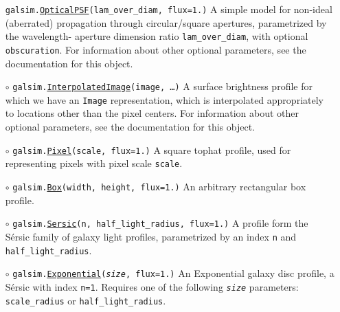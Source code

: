 \documentclass[preprint,10pt]{../../devel/modules/aastex}
\begin{document}
\begin{itemize}
  \texttt{galsim.}\href{http://galsim-developers.github.io/GalSim/classgalsim_1_1optics_1_1_optical_p_s_f.html}{\texttt{OpticalPSF}}\texttt{(lam\_over\_diam, flux=1.)}
    \newline 
    A simple model for non-ideal
    (aberrated) propagation through circular/square apertures, parametrized by the wavelength-
    aperture dimension ratio \texttt{lam\_over\_diam}, with
    optional \texttt{obscuration}.  For information
    about other optional parameters, see the documentation for this object.
\item[$\circ$]
  \texttt{galsim.}\href{http://galsim-developers.github.io/GalSim/classgalsim_1_1interpolatedimage_1_1_interpolated_image.html}{\texttt{InterpolatedImage}}\texttt{(image, \dots)}
    \newline 
    A surface brightness profile for which we have an \texttt{Image} representation,
    which is interpolated appropriately to locations other than the pixel centers.
    For information about other optional parameters, see the documentation for this object.
\item[$\circ$]
  \texttt{galsim.}\href{http://galsim-developers.github.com/GalSim/classgalsim_1_1base_1_1_pixel.html}{\texttt{Pixel}}\texttt{(scale, flux=1.)}
    \newline 
    A square tophat profile, used for representing pixels with pixel scale \texttt{scale}.
\item[$\circ$]
  \texttt{galsim.}\href{http://galsim-developers.github.com/GalSim/classgalsim_1_1base_1_1_box.html}{\texttt{Box}}\texttt{(width, height, flux=1.)}
    \newline 
    An arbitrary rectangular box profile.
\item[$\circ$]
  \texttt{galsim.}\href{http://galsim-developers.github.com/GalSim/classgalsim_1_1base_1_1_sersic.html}{\texttt{Sersic}}\texttt{(n, half\_light\_radius, flux=1.)}
    \newline
    A profile form the S\'{e}rsic family of galaxy light
    profiles, parametrized by an index \texttt{n} and \texttt{half\_light\_radius}.
\item[$\circ$]
  \texttt{galsim.}\href{http://galsim-developers.github.com/GalSim/classgalsim_1_1base_1_1_exponential.html}{\texttt{Exponential}}\texttt{(\emph{size}, flux=1.)}
    \newline 
    An Exponential galaxy disc profile, a S\'{e}rsic
    with index \texttt{n=1}.  Requires one of the
    following \texttt{\emph{size}} parameters: \texttt{scale\_radius} or \texttt{half\_light\_radius}.

\end{itemize}
\end{document}

